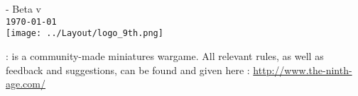 
\setlength{\arrayrulewidth}{2pt}
\renewcommand{\arraystretch}{1.2}

\begin{titlepage}
\begin{center}

\ifdef{\booktitle}{}{\newcommand{\booktitle}{Missing title}}
\ifdef{\version}{}{\newcommand{\version}{Missing version}}

{\antiquefont\fontsize{50}{60}\selectfont {} \\ } \\
\vspace{0.7cm}
{\antiquefont\fontsize{20}{24}\selectfont \booktitle\/ - Beta v\version} \\
\vspace{0.4cm}
{\fontsize{14}{16.8}\selectfont \texttt{\today}} \\
\vfill
\texttt{[image: ../Layout/logo\_9th.png]}
\vfill
{\antiquefont\fontsize{12}{14.4}\selectfont \textit{}} \\


\end{center}

\newpage

\thispagestyle{empty}

{\fontsize{12}{14.4}\selectfont

 :  is a community-made miniatures wargame. All relevant rules, as well as feedback and suggestions, can be found and given here :
\url{http://www.the-ninth-age.com/}


\vfill

}


\end{titlepage}

\restoregeometry